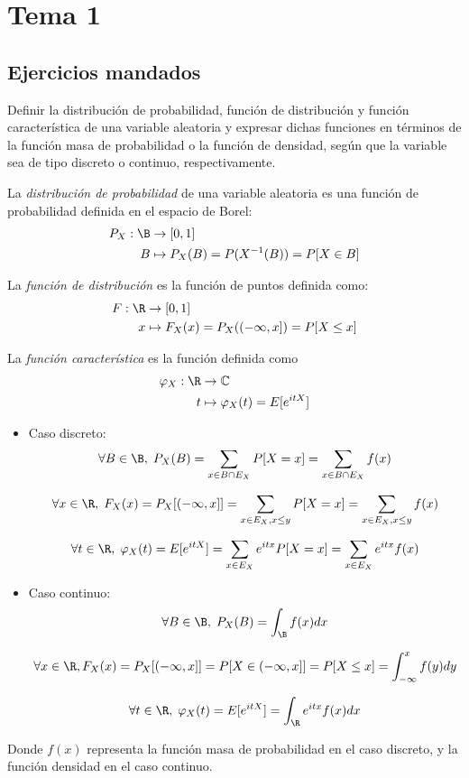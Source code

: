 \section{Tema 1}

\subsection{Ejercicios mandados}

\begin{ejer}
  Definir la distribución de probabilidad, función de distribución y función característica de una variable aleatoria y expresar dichas funciones en términos de la función masa de probabilidad o la función de densidad, según que la variable sea de tipo discreto o continuo, respectivamente.
\end{ejer}

\begin{sol}
  La \emph{distribución de probabilidad} de una variable aleatoria es una función de probabilidad definida en el espacio de Borel:
  \begin{align*}
    P_X : \B & \to [0, 1] \\
    B & \mapsto P_X(B) = P(X^{-1}(B)) = P[X \in B]
  \end{align*}

  La \emph{función de distribución} es la función de puntos definida como:
  \begin{align*}
    F: \R & \to [0, 1] \\
    x & \mapsto  F_X(x) = P_X((-\infty, x]) = P[X \leq x]
  \end{align*}

  La \emph{función característica} es la función definida como
  \begin{align*}
    \varphi_X: \R & \to \mathbb{C} \\
    t & \mapsto \varphi_X(t) = E[e^{itX}]
  \end{align*}

  \begin{itemize}
    \item Caso discreto:
    $$\forall B \in \B, \; P_X(B) = \sum \limits_{x \in B \cap E_X} P[X = x] = \sum \limits_{x \in B \cap E_X} f(x) $$

    $$\forall x \in \R, \; F_X(x) = P_X[(-\infty, x]] = \sum \limits_{x \in E_X, x \leq y} P[X = x] = \sum \limits_{x \in E_X, x \leq y} f(x)$$

    $$\forall t \in \R, \; \varphi_X(t) = E[e^{itX}] = \sum \limits_{x \in E_X} e^{itx}P[X = x] = \sum \limits_{x \in E_X} e^{itx} f(x)$$

    \item Caso continuo:
    $$\forall B \in \B, \; P_X(B) = \int_\B f(x) dx$$

    $$\forall x \in \R, F_X(x) = P_X[(-\infty,x]] = P[X \in (-\infty, x]] = P[X \leq x] = \int^x_{-\infty} f(y)dy$$

    $$\forall t \in \R, \; \varphi_X(t) = E[e^{itX}] = \int_\R e^{itx} f(x) dx$$
  \end{itemize}
  Donde $f(x)$ representa la función masa de probabilidad en el caso discreto, y la función densidad en el caso continuo.
\end{sol}

